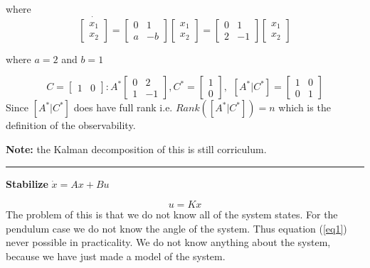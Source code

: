 \documentclass[a4paper]{article}
\begin{document}
where 
\begin{equation}
	\dot{\begin{bmatrix}
x_1 \\
x_2
\end{bmatrix} } = \begin{bmatrix}
0 & 1 \\
a & -b
\end{bmatrix} \begin{bmatrix}
x_1 \\
x_2
\end{bmatrix} = \begin{bmatrix}
0 & 1 \\
2 & -1
\end{bmatrix} \begin{bmatrix}
x_1 \\
x_2
\end{bmatrix} 
\end{equation}

where $ a = 2 $ and  $ b = 1 $

\begin{equation}
	C =  \begin{bmatrix}
	1 & 0 
\end{bmatrix} : A^{*} \begin{bmatrix}
0 & 2 \\
1 & -1
\end{bmatrix}, C^{*} = \begin{bmatrix}
1 \\
0
\end{bmatrix}, \hspace{5pt}
[A^{*}|C^{*}] = \begin{bmatrix}
1 & 0 \\
0 & 1
\end{bmatrix}
\end{equation}
Since $[A^{*}|C^{*}]$ does have full rank i.e.  $ Rank([A^{*}|C^{*}]) = n $ which is the definition of the observability.

\textbf{Note:} the Kalman decomposition of this is still corriculum.

\vspace{5pt}
\hrule
\vspace{5pt}
\textbf{Stabilize} $ \dot{x} = Ax + Bu $

\begin{equation}\label{eq1}
u = K x
\end{equation}
The problem of this is that we do not know all of the system states. For the pendulum case we do not know the angle of the system. Thus equation (\ref{eq1}) never possible in practicality. We do not know anything about the system, because we have just made a model of the system.
\end{document}
